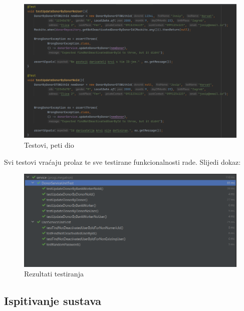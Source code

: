         		\begin{figure}[H]
                    \includegraphics[scale=0.6]{slike/Tests/test5.png}
        			\centering
        			\caption{Testovi, peti dio}
        			\label{fig:controller}
        		\end{figure}
        		
        	Svi testovi vraćaju prolaz te sve testirane funkcionalnosti rade. Slijedi dokaz:
			
			\begin{figure}[H]
                    \includegraphics[scale=0.7]{slike/testovi rezultat.png}
        			\centering
        			\caption{Rezultati testiranja}
        			\label{fig:controller}
        		\end{figure}
			
			
			\eject
			\subsection{Ispitivanje sustava}
			
			 
